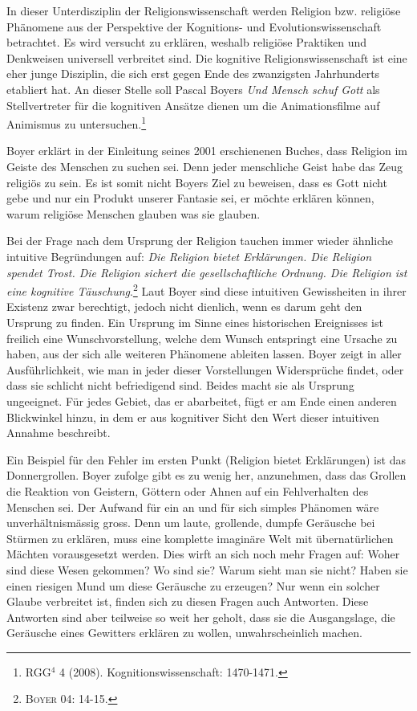 In dieser Unterdisziplin der Religionswissenschaft werden Religion bzw. religiöse Phänomene aus der Perspektive der Kognitions- und Evolutionswissenschaft betrachtet. Es wird versucht zu erklären, weshalb religiöse Praktiken und Denk\-weisen universell verbreitet sind. Die kognitive Religionswissenschaft ist eine eher junge Disziplin, die sich erst gegen Ende des zwanzigsten Jahrhunderts etabliert hat. An dieser Stelle soll Pascal Boyers \emph{Und Mensch schuf Gott} als Stellvertreter für die kognitiven Ansätze dienen um die Animationsfilme auf Animismus zu untersuchen.\footnote{RGG$^4$ 4 (2008). Kognitionswissenschaft: 1470-1471.}

Boyer erklärt in der Einleitung seines 2001 erschienenen Buches, dass Religion im Geiste des Menschen zu suchen sei. Denn jeder menschliche Geist habe das Zeug religiös zu sein. Es ist somit nicht Boyers Ziel zu beweisen, dass es Gott nicht gebe und nur ein Produkt unserer Fantasie sei, er möchte erklären können, warum religiöse Menschen glauben was sie glauben.

Bei der Frage nach dem Ursprung der Religion tauchen immer wieder ähnliche intuitive Begründungen auf: \emph{Die Religion bietet Erklärungen. Die Religion spen\-det Trost. Die Religion sichert die gesellschaftliche Ordnung. Die Religion ist eine kognitive Täuschung}.\footnote{\textsc{Boyer 04: 14-15.}} Laut Boyer sind diese intuitiven Gewissheiten in ihrer Existenz zwar berechtigt, jedoch nicht dienlich, wenn es darum geht den Ursprung zu finden. Ein Ursprung im Sinne eines historischen Ereignisses ist freilich eine Wunschvorstellung, welche dem Wunsch entspringt eine Ursache zu haben, aus der sich alle weiteren Phänomene ableiten lassen. Boyer zeigt in aller Ausführlichkeit, wie man in jeder dieser Vorstellungen Widersprüche fin\-det, oder dass sie schlicht nicht befriedigend sind. Beides macht sie als Ursprung ungeeignet. Für jedes Gebiet, das er abarbeitet, fügt er am Ende einen anderen Blickwinkel hinzu, in dem er aus kognitiver Sicht den Wert dieser intuitiven Annahme beschreibt.

Ein Beispiel für den Fehler im ersten Punkt (Religion bietet Erklärungen) ist das Donnergrollen. Boyer zufolge gibt es zu wenig her, anzunehmen, dass das Grollen die Reaktion von Geistern, Göttern oder Ahnen auf ein Fehlverhalten des Menschen sei. Der Aufwand für ein an und für sich simples Phänomen wäre unverhältnismässig gross. Denn um laute, grollende, dumpfe Geräusche bei Stürmen zu erklären, muss eine komplette imaginäre Welt mit übernatürlichen Mächten vorausgesetzt werden. Dies wirft an sich noch mehr Fragen auf: Woher sind diese Wesen gekommen? Wo sind sie? Warum sieht man sie nicht? Haben sie einen riesigen Mund um diese Geräusche zu erzeugen? Nur wenn ein solcher Glaube verbreitet ist, finden sich zu diesen Fragen auch Antworten. Diese Antworten sind aber teilweise so weit her geholt, dass sie die Ausgangslage, die Geräusche eines Gewitters erklären zu wollen, unwahrscheinlich machen. 

